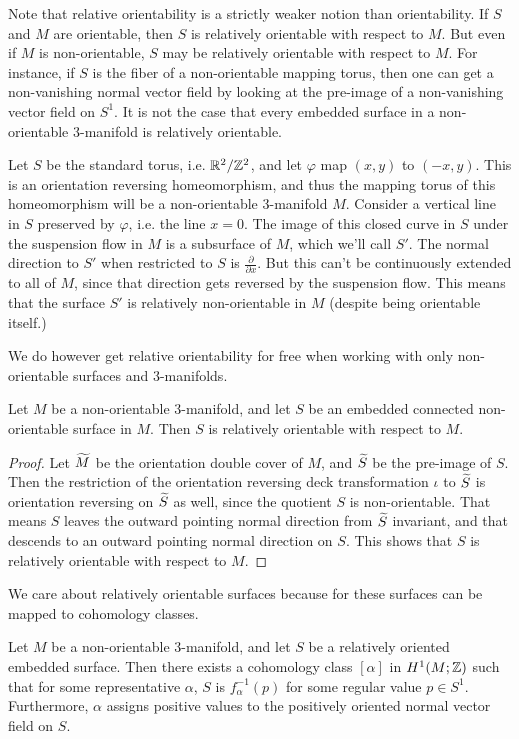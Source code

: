 Note that relative orientability is a strictly weaker notion than orientability. If $S$ and $M$ are
orientable, then $S$ is relatively orientable with respect to $M$. But even if $M$ is
non-orientable, $S$ may be relatively orientable with respect to $M$. For instance, if $S$ is
the fiber of a non-orientable mapping torus, then one can get a non-vanishing normal vector field
by looking at the pre-image of a non-vanishing vector field on $S^1$.
It is not the case that every embedded surface in a non-orientable $3$-manifold is relatively orientable.
\begin{example}
  Let $S$ be the standard torus, i.e. $\mathbb{R}^2/\mathbb{Z}^2$, and let $\varphi$ map $(x,y)$ to $(-x, y)$. This is an
  orientation reversing homeomorphism, and thus the mapping torus of this homeomorphism will be a
  non-orientable $3$-manifold $M$. Consider a vertical line in $S$ preserved by $\varphi$, i.e. the line
  $x = 0$. The image of this closed curve in $S$ under the suspension flow in $M$ is a subsurface of $M$,
  which we'll call $S'$. The normal direction to $S'$ when restricted to $S$ is $\frac{\partial}{\partial x}$. But
  this can't be continuously extended to all of $M$, since that direction gets reversed by the suspension flow.
  This means that the surface $S'$ is relatively non-orientable in $M$ (despite being orientable itself.)
\end{example}
We do however get relative orientability for free when working with only non-orientable surfaces and $3$-manifolds.
\begin{prop}
  \label{prop:relative-orientability}
  Let $M$ be a non-orientable $3$-manifold, and let $S$ be an embedded connected non-orientable surface in $M$.
  Then $S$ is relatively orientable with respect to $M$.
\end{prop}
\begin{proof}
  Let $\widetilde{M}$ be the orientation double cover of $M$, and $\widetilde{S}$ be the pre-image of $S$. Then the
  restriction of the orientation reversing deck transformation $\iota$ to $\widetilde{S}$ is orientation reversing on $\widetilde{S}$
  as well, since the quotient $S$ is non-orientable. That means $S$ leaves the outward pointing normal
  direction from $\widetilde{S}$ invariant, and that descends to an outward pointing normal direction on $S$. This
  shows that $S$ is relatively orientable with respect to $M$.
\end{proof}

We care about relatively orientable surfaces because for these surfaces can be mapped to cohomology classes.
\begin{thm}
  \label{thm:Poincare-duality}
  Let $M$ be a non-orientable $3$-manifold, and let $S$ be a relatively oriented embedded
  surface. Then there exists a cohomology class $[\alpha]$ in $H^1(M; \mathbb{Z})$ such that for some
  representative $\alpha$, $S$ is $f_{\alpha}^{-1}(p)$ for some regular value $p \in
  S^1$. Furthermore, $\alpha$ assigns positive values to the positively oriented normal vector
  field on $S$.
\end{thm}

